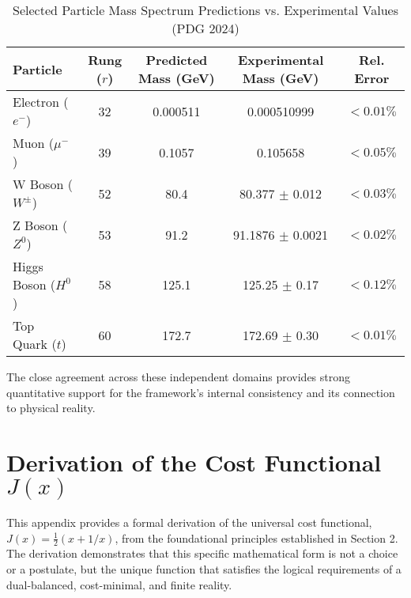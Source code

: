 \documentclass[11pt,a4paper]{article}
\begin{document}
\begin{table}[h!]
\centering
\caption{Selected Particle Mass Spectrum Predictions vs. Experimental Values (PDG 2024)}
\label{tab:masses}
\begin{tabular}{lcccc}
\toprule
\textbf{Particle} & \textbf{Rung (\(r\))} & \textbf{Predicted Mass (GeV)} & \textbf{Experimental Mass (GeV)} & \textbf{Rel. Error} \\
\midrule
Electron (\(e^-\)) & 32 & 0.000511 & 0.000510999 & \(<0.01\%\) \\
Muon (\(\mu^-\)) & 39 & 0.1057 & 0.105658 & \(<0.05\%\) \\
W Boson (\(W^\pm\)) & 52 & 80.4 & 80.377 \(\pm\) 0.012 & \(<0.03\%\) \\
Z Boson (\(Z^0\)) & 53 & 91.2 & 91.1876 \(\pm\) 0.0021 & \(<0.02\%\) \\
Higgs Boson (\(H^0\)) & 58 & 125.1 & 125.25 \(\pm\) 0.17 & \(<0.12\%\) \\
Top Quark (\(t\)) & 60 & 172.7 & 172.69 \(\pm\) 0.30 & \(<0.01\%\) \\
\bottomrule
\end{tabular}
\end{table}

The close agreement across these independent domains provides strong quantitative support for the framework's internal consistency and its connection to physical reality.

\section{Derivation of the Cost Functional \texorpdfstring{$J(x)$}{J(x)}}
This appendix provides a formal derivation of the universal cost functional, \(J(x) = \frac{1}{2}(x + 1/x)\), from the foundational principles established in Section 2. The derivation demonstrates that this specific mathematical form is not a choice or a postulate, but the unique function that satisfies the logical requirements of a dual-balanced, cost-minimal, and finite reality.
\end{document}
